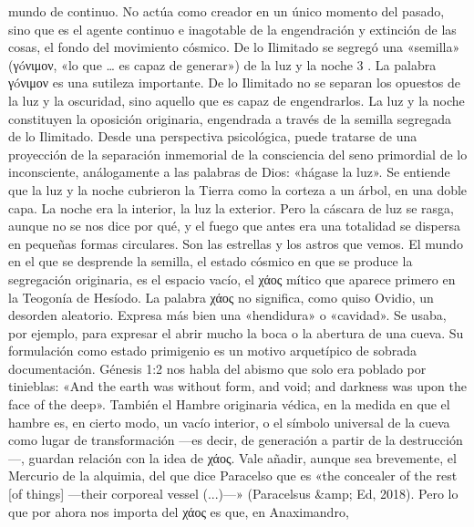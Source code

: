 \documentclass[a4paper]{article}
\begin{document}
mundo de continuo. No actúa como creador en un único momento del pasado, sino
que es el agente continuo e inagotable de la engendración y extinción de las
cosas, el fondo del movimiento cósmico. De lo Ilimitado se segregó una «semilla»
(γóνιμον, «lo que … es capaz de generar») de la luz y la noche 3 . La palabra
γóνιμον es una sutileza importante. De lo Ilimitado no se separan los opuestos
de la luz y la oscuridad, sino aquello que es capaz de engendrarlos. La luz y la
noche constituyen la oposición originaria, engendrada a través de la semilla
segregada de lo Ilimitado. Desde una perspectiva psicológica, puede tratarse de
una proyección de la separación inmemorial de la consciencia del seno primordial
de lo inconsciente, análogamente a las palabras de Dios: «hágase la luz». Se
entiende que la luz y la noche cubrieron la Tierra como la corteza a un árbol,
en una doble capa. La noche era la interior, la luz la exterior. Pero la cáscara
de luz se rasga, aunque no se nos dice por qué, y el fuego que antes era una
totalidad se dispersa en pequeñas formas circulares. Son las estrellas y los
astros que vemos. El mundo en el que se desprende la semilla, el estado cósmico
en que se produce la segregación originaria, es el espacio vacío, el χάος mítico
que aparece primero en la Teogonía de Hesíodo. La palabra χάος no significa,
como quiso Ovidio, un desorden aleatorio. Expresa más bien una «hendidura» o
«cavidad». Se usaba, por ejemplo, para expresar el abrir mucho la boca o la
abertura de una cueva. Su formulación como estado primigenio es un motivo
arquetípico de sobrada documentación. Génesis 1:2 nos habla del abismo que solo
era poblado por tinieblas: «And the earth was without form, and void; and
darkness was upon the face of the deep». También el Hambre originaria védica, en
la medida en que el hambre es, en cierto modo, un vacío interior, o el símbolo
universal de la cueva como lugar de transformación —es decir, de generación a
partir de la destrucción—, guardan relación con la idea de χάος. Vale añadir,
aunque sea brevemente, el Mercurio de la alquimia, del que dice Paracelso que es
«the concealer of the rest [of things] —their corporeal vessel (...)—»
(Paracelsus &amp; Ed, 2018). Pero lo que por ahora nos importa del χάος es que,
en Anaximandro,
\end{document}
